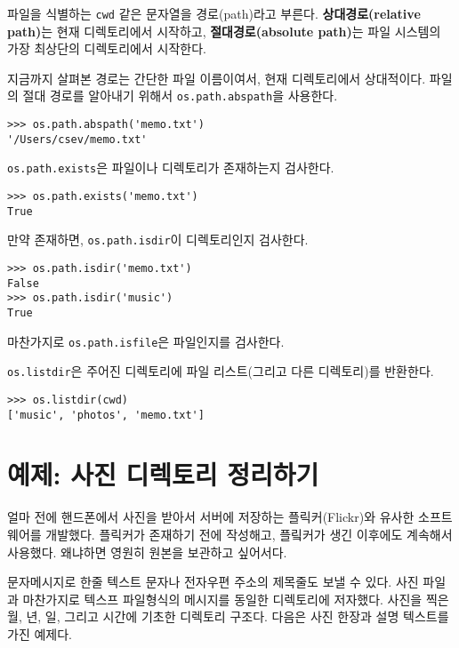 파일을 식별하는 {\tt cwd} 같은 문자열을 경로(path)라고 부른다.
{\bf 상대경로(relative path)}는 현재 디렉토리에서 시작하고,
{\bf 절대경로(absolute path)}는 파일 시스템의 가장 최상단의 디렉토리에서 시작한다.


지금까지 살펴본 경로는 간단한 파일 이름이여서, 현재 디렉토리에서 상대적이다.
파일의 절대 경로를 알아내기 위해서 {\tt os.path.abspath}을 사용한다.

\beforeverb
\begin{verbatim}
>>> os.path.abspath('memo.txt')
'/Users/csev/memo.txt'
\end{verbatim}
\afterverb
%

{\tt os.path.exists}은 파일이나 디렉토리가 존재하는지 검사한다.


\beforeverb
\begin{verbatim}
>>> os.path.exists('memo.txt')
True
\end{verbatim}
\afterverb
%

만약 존재하면, {\tt os.path.isdir}이 디렉토리인지 검사한다.

\beforeverb
\begin{verbatim}
>>> os.path.isdir('memo.txt')
False
>>> os.path.isdir('music')
True
\end{verbatim}
\afterverb
%

마찬가지로 {\tt os.path.isfile}은 파일인지를 검사한다.

{\tt os.listdir}은 주어진 디렉토리에 파일 리스트(그리고 다른 디렉토리)를 반환한다.

\beforeverb
\begin{verbatim}
>>> os.listdir(cwd)
['music', 'photos', 'memo.txt']
\end{verbatim}
\afterverb
%


\section{예제: 사진 디렉토리 정리하기}

얼마 전에 핸드폰에서 사진을 받아서 서버에 저장하는 플릭커(Flickr)와 유사한 소프트웨어를 개발했다.
플릭커가 존재하기 전에 작성해고, 플맄커가 생긴 이후에도 계속해서 사용했다.
왜냐하면 영원히 원본을 보관하고 싶어서다.

문자메시지로 한줄 텍스트 문자나 전자우편 주소의 제목줄도 보낼 수 있다. 
사진 파일과 마찬가지로 텍스프 파일형식의 메시지를 동일한 디렉토리에 저자했다.
사진을 찍은 월, 년, 일, 그리고 시간에 기초한 디렉토리 구조다.
다음은 사진 한장과 설명 텍스트를 가진 예제다.

